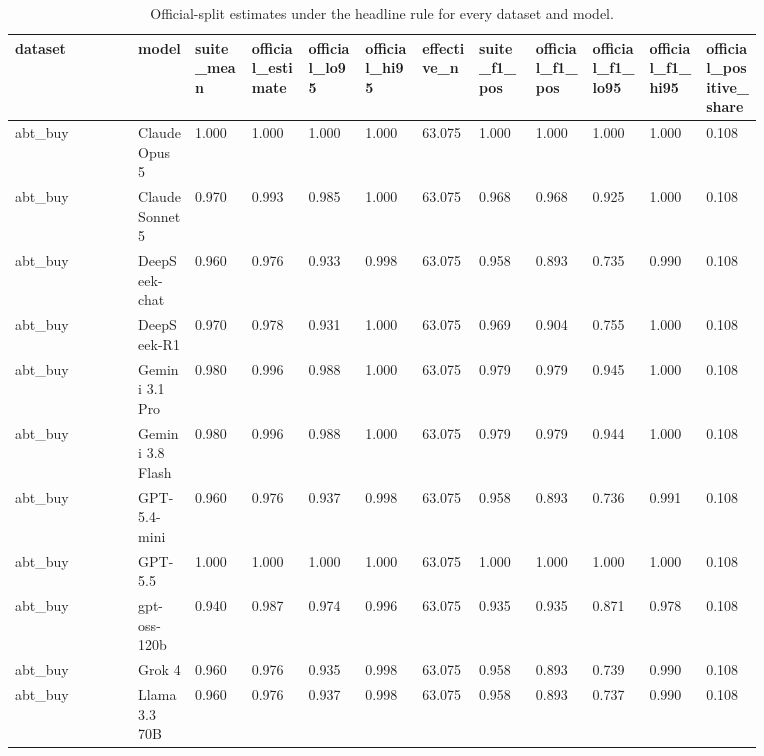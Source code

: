 \begin{landscape}
\tiny
\setlength{\tabcolsep}{3pt}
\begin{longtable}{p{0.134\linewidth}p{0.067\linewidth}p{0.067\linewidth}p{0.067\linewidth}p{0.067\linewidth}p{0.067\linewidth}p{0.067\linewidth}p{0.067\linewidth}p{0.067\linewidth}p{0.067\linewidth}p{0.067\linewidth}p{0.067\linewidth}}
\caption{Official-split estimates under the headline rule for every dataset and model.}\label{tab:official_split}\\
\toprule
dataset & model & suite\_\allowbreak{}mean & official\_\allowbreak{}estimate & official\_\allowbreak{}lo95 & official\_\allowbreak{}hi95 & effective\_\allowbreak{}n & suite\_\allowbreak{}f1\_\allowbreak{}pos & official\_\allowbreak{}f1\_\allowbreak{}pos & official\_\allowbreak{}f1\_\allowbreak{}lo95 & official\_\allowbreak{}f1\_\allowbreak{}hi95 & official\_\allowbreak{}positive\_\allowbreak{}share \\
\midrule
abt\_\allowbreak{}buy & Claude Opus 5 & 1.000 & 1.000 & 1.000 & 1.000 & 63.075 & 1.000 & 1.000 & 1.000 & 1.000 & 0.108 \\
abt\_\allowbreak{}buy & Claude Sonnet 5 & 0.970 & 0.993 & 0.985 & 1.000 & 63.075 & 0.968 & 0.968 & 0.925 & 1.000 & 0.108 \\
abt\_\allowbreak{}buy & DeepSeek-chat & 0.960 & 0.976 & 0.933 & 0.998 & 63.075 & 0.958 & 0.893 & 0.735 & 0.990 & 0.108 \\
abt\_\allowbreak{}buy & DeepSeek-R1 & 0.970 & 0.978 & 0.931 & 1.000 & 63.075 & 0.969 & 0.904 & 0.755 & 1.000 & 0.108 \\
abt\_\allowbreak{}buy & Gemini 3.1 Pro & 0.980 & 0.996 & 0.988 & 1.000 & 63.075 & 0.979 & 0.979 & 0.945 & 1.000 & 0.108 \\
abt\_\allowbreak{}buy & Gemini 3.8 Flash & 0.980 & 0.996 & 0.988 & 1.000 & 63.075 & 0.979 & 0.979 & 0.944 & 1.000 & 0.108 \\
abt\_\allowbreak{}buy & GPT-5.4-mini & 0.960 & 0.976 & 0.937 & 0.998 & 63.075 & 0.958 & 0.893 & 0.736 & 0.991 & 0.108 \\
abt\_\allowbreak{}buy & GPT-5.5 & 1.000 & 1.000 & 1.000 & 1.000 & 63.075 & 1.000 & 1.000 & 1.000 & 1.000 & 0.108 \\
abt\_\allowbreak{}buy & gpt-oss-120b & 0.940 & 0.987 & 0.974 & 0.996 & 63.075 & 0.935 & 0.935 & 0.871 & 0.978 & 0.108 \\
abt\_\allowbreak{}buy & Grok 4 & 0.960 & 0.976 & 0.935 & 0.998 & 63.075 & 0.958 & 0.893 & 0.739 & 0.990 & 0.108 \\
abt\_\allowbreak{}buy & Llama 3.3 70B & 0.960 & 0.976 & 0.937 & 0.998 & 63.075 & 0.958 & 0.893 & 0.737 & 0.990 & 0.108 \\

\end{longtable}
\end{landscape}
